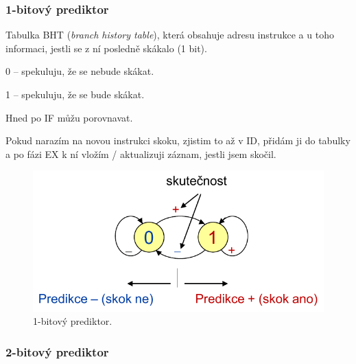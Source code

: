 \subsubsection{1-bitový prediktor}

\begin{compactitem}
    \item Tabulka BHT (\textit{branch history table}), která obsahuje adresu instrukce a u toho informaci, jestli se z ní posledně skákalo (1 bit). \begin{compactitem}
        \item 0 -- spekuluju, že se nebude skákat.
        \item 1 -- spekuluju, že se bude skákat.
    \end{compactitem}
    \item Hned po IF můžu porovnavat.
    \item Pokud narazím na novou instrukci skoku, zjistim to až v ID, přidám ji do tabulky a po fázi EX k ní vložím / aktualizuji záznam, jestli jsem skočil.

    \begin{figure}[H]
        \centering
        \includegraphics[width=0.5\linewidth]{prediktor_jednobitovy.pdf}
        \caption{1-bitový prediktor.}
    \end{figure}
\end{compactitem}

\subsubsection{2-bitový prediktor}

